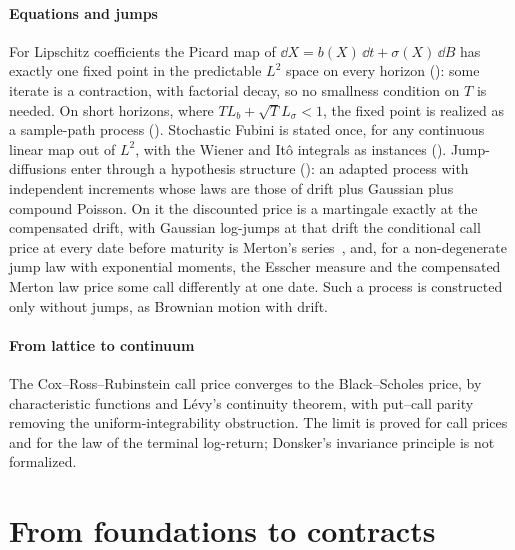 \documentclass[11pt]{article}
\begin{document}
\paragraph{Equations and jumps}
For Lipschitz coefficients the Picard map of $\dd X=b(X)\,\dd t+\sigma(X)\,\dd B$ has exactly one fixed point in the
predictable $L^2$ space on every horizon (): some iterate is a
contraction, with factorial decay, so no smallness condition on $T$ is needed. On short horizons, where
$TL_b+\sqrt TL_\sigma<1$, the fixed point is realized as a sample-path process ().
Stochastic Fubini is stated once, for any continuous linear map out of $L^2$, with the Wiener and It\^o integrals as
instances (). Jump-diffusions enter through a hypothesis structure (): an
adapted process with independent increments whose laws are those of drift plus Gaussian plus compound Poisson. On it the
discounted price is a martingale exactly at the compensated drift, with Gaussian log-jumps at that drift the conditional call price at every date before maturity is Merton's
series~\cite{Merton1976}, and, for a non-degenerate jump law with exponential moments, the Esscher measure and the
compensated Merton law price some call differently at one date. Such a process is
constructed only without jumps, as Brownian motion with drift.

\paragraph{From lattice to continuum}
The Cox--Ross--Rubinstein call price converges to the Black--Scholes price, by characteristic functions and L\'evy's
continuity theorem, with put--call parity removing the uniform-integrability obstruction. The limit is proved for call
prices and for the law of the terminal log-return; Donsker's invariance principle is not formalized.

\section{From foundations to contracts}\label{sec:contracts}
\end{document}
